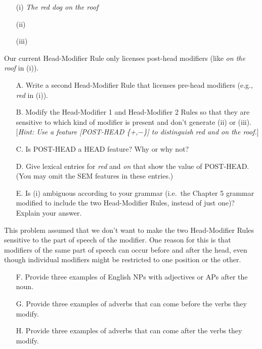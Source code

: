 \documentclass[a4paper,landscape,headrule,footrule,dvips]{foils}
\begin{document}
\begin{itemize}
\item[(i)] \textit{The red dog on the roof}
\item[(ii)]  
\item[(iii)]  
\end{itemize}
%
Our current Head-Modifier Rule only licenses post-head modifiers
(like {\it on the roof} in (i)).

\newpage 
\begin{itemize}
\item[A.] Write a second Head-Modifier Rule that licenses
pre-head modifiers
(e.g., {\it red} in (i)).
\item[B.] Modify the Head-Modifier 1 and Head-Modifier 2 Rules so that
they are sensitive to which kind of modifier is present and don't
generate (ii) or (iii).  [\textsl{Hint: Use a feature
{\rm [}POST-HEAD \{+,$-$\}{\rm ]} to distinguish {\it red} and {\it on the roof}.}]
\item[C.] Is POST-HEAD a HEAD feature? Why or why not? 
\item[D.] Give lexical entries for {\it red} and {\it on} that show
the value of POST-HEAD. (You may omit the SEM features in these entries.)
\item[E.] Is (i) ambiguous according to your grammar (i.e.\ 
the Chapter 5 grammar modified to include the two Head-Modifier Rules,
instead of just one)? Explain your answer.  
\end{itemize}

This problem assumed that we don't want to make the two Head-Modifier
Rules sensitive to the part of speech of the modifier.  One reason for
this is that modifiers of the same part of speech can occur before and
after the head, even though individual modifiers might be restricted
to one position or the other.

\begin{itemize}
\item[F.] Provide three examples of English NPs with
adjectives or APs after the noun. 
\item[G.] Provide three examples of adverbs that can come before 
the verbs they modify.
\item[H.] Provide three examples of adverbs that can come after
the verbs they modify.
\end{itemize}
\end{document}
